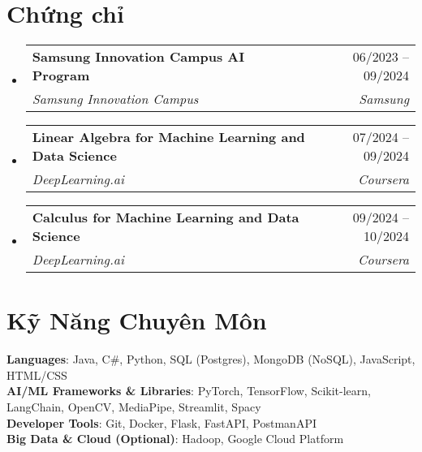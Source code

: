 \documentclass[letterpaper,11pt]{article}
\makeatletter
\newcommand{\resumeSubheading}[4]{
	\vspace{-2pt}\item
	\begin{tabular*}{0.97\textwidth}[t]{l@{\extracolsep{\fill}}r}
		\textbf{#1} & #2 \\
		\textit{\small#3} & \textit{\small #4} \\
	\end{tabular*}\vspace{-7pt}
}
\newcommand{\resumeSubHeadingListStart}{\begin{itemize}[leftmargin=0.15in, label={}]}
\newcommand{\resumeSubHeadingListEnd}{\end{itemize}}
\makeatother
\begin{document}
\section{Chứng chỉ}
	\resumeSubHeadingListStart
		\resumeSubheading
			{Samsung Innovation Campus AI Program}{06/2023 -- 09/2024}
			{Samsung Innovation Campus}{Samsung}

		\resumeSubheading
			{Linear Algebra for Machine Learning and Data Science}{07/2024 -- 09/2024}
			{DeepLearning.ai}{Coursera}

		\resumeSubheading
			{Calculus for Machine Learning and Data Science} {09/2024 -- 10/2024}
			{DeepLearning.ai}{Coursera}
	\resumeSubHeadingListEnd

\section{Kỹ Năng Chuyên Môn}
\begin{itemize}[leftmargin=0.15in, label={}]
\small{\item{
	\textbf{Languages}{: Java, C\#, Python, SQL (Postgres), MongoDB (NoSQL), JavaScript, HTML/CSS} \\
	\textbf{AI/ML Frameworks \& Libraries}{: PyTorch, TensorFlow, Scikit-learn, LangChain, OpenCV, MediaPipe, Streamlit, Spacy} \\
	\textbf{Developer Tools}{: Git, Docker, Flask, FastAPI, PostmanAPI} \\
	\textbf{Big Data \& Cloud (Optional)}{: Hadoop, Google Cloud Platform}
}}
\end{itemize}
\end{document}
